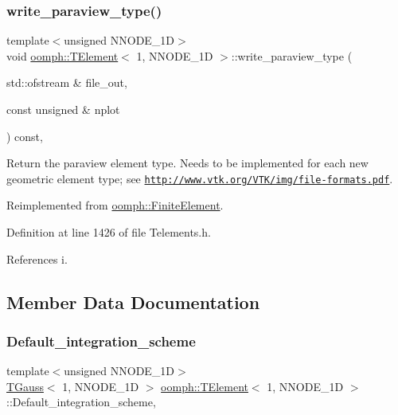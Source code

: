 \subsubsection{\texorpdfstring{write\+\_\+paraview\+\_\+type()}{write\_paraview\_type()}}
{\footnotesize\ttfamily template$<$unsigned N\+N\+O\+D\+E\+\_\+1D$>$ \\
void \hyperlink{classoomph_1_1TElement}{oomph\+::\+T\+Element}$<$ 1, N\+N\+O\+D\+E\+\_\+1D $>$\+::write\+\_\+paraview\+\_\+type (\begin{DoxyParamCaption}\item[{std\+::ofstream \&}]{file\+\_\+out,  }\item[{const unsigned \&}]{nplot }\end{DoxyParamCaption}) const\hspace{0.3cm}{\ttfamily [inline]}, {\ttfamily [virtual]}}



Return the paraview element type. Needs to be implemented for each new geometric element type; see \href{http://www.vtk.org/VTK/img/file-formats.pdf}{\tt http\+://www.\+vtk.\+org/\+V\+T\+K/img/file-\/formats.\+pdf}. 



Reimplemented from \hyperlink{classoomph_1_1FiniteElement_a68f0f8dc76f04e7d69983ec711b4ab08}{oomph\+::\+Finite\+Element}.



Definition at line 1426 of file Telements.\+h.



References i.



\subsection{Member Data Documentation}
\mbox{\label{classoomph_1_1TElement_3_011_00_01NNODE__1D_01_4_ac17af50be3265871c7a24d20a4165fc0}} 
\subsubsection{\texorpdfstring{Default\+\_\+integration\+\_\+scheme}{Default\_integration\_scheme}}
{\footnotesize\ttfamily template$<$unsigned N\+N\+O\+D\+E\+\_\+1D$>$ \\
\hyperlink{classoomph_1_1TGauss}{T\+Gauss}$<$ 1, N\+N\+O\+D\+E\+\_\+1D $>$ \hyperlink{classoomph_1_1TElement}{oomph\+::\+T\+Element}$<$ 1, N\+N\+O\+D\+E\+\_\+1D $>$\+::Default\+\_\+integration\+\_\+scheme\hspace{0.3cm}{\ttfamily [static]}, {\ttfamily [private]}}



